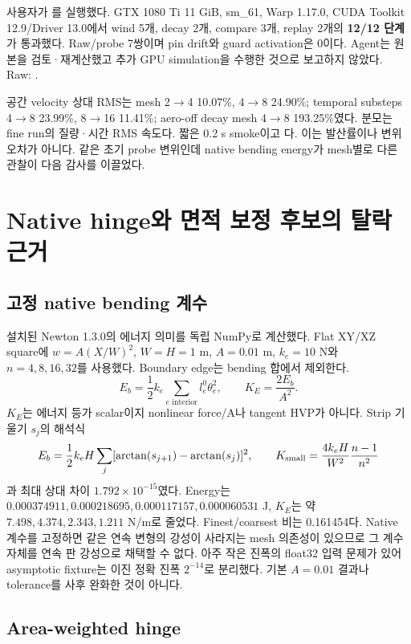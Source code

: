 \documentclass[10pt]{article}
\begin{document}
사용자가 를 실행했다.
GTX 1080 Ti 11 GiB, sm\_61, Warp 1.17.0, CUDA Toolkit 12.9/Driver 13.0에서
wind 5개, decay 2개, compare 3개, replay 2개의 \textbf{12/12 단계}가 통과했다.
Raw/probe 7쌍이며 pin drift와 guard activation은 0이다. Agent는 원본을 검토·재계산했고
추가 GPU simulation을 수행한 것으로 보고하지 않았다.
Raw: .

공간 velocity 상대 RMS는 mesh 2$\to$4 10.07\%, 4$\to$8 24.90\%; temporal substeps
4$\to$8 23.99\%, 8$\to$16 11.41\%; aero-off decay mesh 4$\to$8 193.25\%였다.
분모는 fine run의 질량·시간 RMS 속도다. 짧은 0.2 s smoke이고
다. 이는 발산률이나 변위 오차가 아니다.
같은 초기 probe 변위인데 native bending energy가 mesh별로 다른 관찰이 다음 감사를 이끌었다.

\section{Native hinge와 면적 보정 후보의 탈락 근거}

\subsection{고정 native bending 계수}

설치된 Newton 1.3.0의 에너지 의미를 독립 NumPy로 계산했다. Flat XY/XZ square에
\(w=A(X/W)^2\), \(W=H=1\) m, \(A=0.01\) m, \(k_e=10\) N와
\(n=4,8,16,32\)를 사용했다. Boundary edge는 bending 합에서 제외한다.
\[
 E_b=\frac12 k_e\sum_{e\text{ interior}}l_e^0\theta_e^2,
 \qquad K_E=\frac{2E_b}{A^2}.
\]
\(K_E\)는 에너지 등가 scalar이지 nonlinear force/A나 tangent HVP가 아니다.
Strip 기울기 \(s_j\)의 해석식
\[
 E_b=\frac12 k_eH\sum_j[\arctan(s_{j+1})-\arctan(s_j)]^2,
 \qquad K_{\rm small}=\frac{4k_eH}{W^2}\frac{n-1}{n^2}
\]
과 최대 상대 차이 \(1.792\times10^{-15}\)였다.
Energy는 \(0.000374911,0.000218695,0.000117157,0.000060531\) J,
\(K_E\)는 약 \(7.498,4.374,2.343,1.211\) N/m로 줄었다.
Finest/coarsest 비는 0.161454다. Native 계수를 고정하면 같은 연속 변형의 강성이 사라지는
mesh 의존성이 있으므로 그 계수 자체를 연속 판 강성으로 채택할 수 없다.
아주 작은 진폭의 float32 입력 문제가 있어 asymptotic fixture는 이진 정확 진폭 \(2^{-14}\)로
분리했다. 기본 \(A=0.01\) 결과나 tolerance를 사후 완화한 것이 아니다.

\subsection{Area-weighted hinge}
\end{document}
